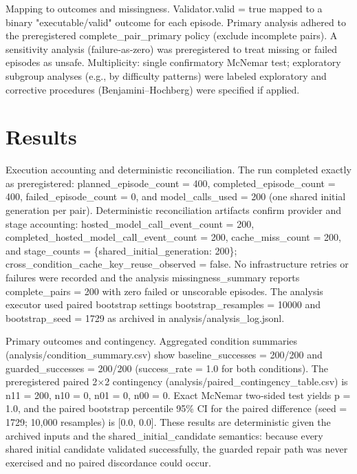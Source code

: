 \documentclass[conference]{IEEEtran}
\begin{document}
Mapping to outcomes and missingness. Validator.valid = true mapped to a binary "executable/valid" outcome for each episode. Primary analysis adhered to the preregistered complete\_pair\_primary policy (exclude incomplete pairs). A sensitivity analysis (failure‑as‑zero) was preregistered to treat missing or failed episodes as unsafe. Multiplicity: single confirmatory McNemar test; exploratory subgroup analyses (e.g., by difficulty patterns) were labeled exploratory and corrective procedures (Benjamini--Hochberg) were specified if applied.

\section{Results}
Execution accounting and deterministic reconciliation. The run completed exactly as preregistered: planned\_episode\_count = 400, completed\_episode\_count = 400, failed\_episode\_count = 0, and model\_calls\_used = 200 (one shared initial generation per pair). Deterministic reconciliation artifacts confirm provider and stage accounting: hosted\_model\_call\_event\_count = 200, completed\_hosted\_model\_call\_event\_count = 200, cache\_miss\_count = 200, and stage\_counts = \{shared\_initial\_generation: 200\}; cross\_condition\_cache\_key\_reuse\_observed = false. No infrastructure retries or failures were recorded and the analysis missingness\_summary reports complete\_pairs = 200 with zero failed or unscorable episodes. The analysis executor used paired bootstrap settings bootstrap\_resamples = 10000 and bootstrap\_seed = 1729 as archived in analysis/analysis\_log.jsonl.

Primary outcomes and contingency. Aggregated condition summaries (analysis/condition\_summary.csv) show baseline\_successes = 200/200 and guarded\_successes = 200/200 (success\_rate = 1.0 for both conditions). The preregistered paired 2\ensuremath{\times}2 contingency (analysis/paired\_contingency\_table.csv) is n11 = 200, n10 = 0, n01 = 0, n00 = 0. Exact McNemar two‑sided test yields p = 1.0, and the paired bootstrap percentile 95\% CI for the paired difference (seed = 1729; 10,000 resamples) is [0.0, 0.0]. These results are deterministic given the archived inputs and the shared\_initial\_candidate semantics: because every shared initial candidate validated successfully, the guarded repair path was never exercised and no paired discordance could occur.
\end{document}
